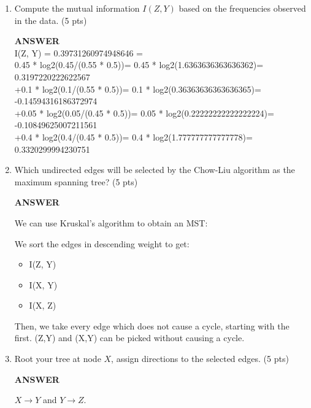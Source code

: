 \documentclass[a4paper]{article}
\theoremstyle{definition}
\begin{document}
\begin{enumerate}
	\item Compute the mutual information $I(Z, Y)$ based on the frequencies observed in the data. (5 pts)

        \textbf{ANSWER} \\
        I(Z, Y) = 0.39731260974948646 = \\
        0.45 * log2(0.45/(0.55 * 0.5))= 0.45 * log2(1.6363636363636362)= 0.3197220222622567\\
        +0.1 * log2(0.1/(0.55 * 0.5))= 0.1 * log2(0.36363636363636365)= -0.14594316186372974\\
        +0.05 * log2(0.05/(0.45 * 0.5))= 0.05 * log2(0.22222222222222224)= -0.10849625007211561\\
        +0.4 * log2(0.4/(0.45 * 0.5))= 0.4 * log2(1.777777777777778)= 0.3320299994230751\\

        \newpage
 
	\item Which undirected edges will be selected by the Chow-Liu algorithm as the maximum spanning tree? (5 pts)

        \textbf{ANSWER}
        
        We can use Kruskal's algorithm to obtain an MST: 
        
        We sort the edges in descending weight to get:
        \begin{itemize}
            \item I(Z, Y)
            \item I(X, Y)
            \item I(X, Z)
        \end{itemize}

        Then, we take every edge  which does not cause a cycle, starting with the first.
        (Z,Y) and (X,Y) can be picked without causing a cycle.
        
	\item Root your tree at node $X$, assign directions to the selected edges. (5 pts)

        \textbf{ANSWER}
        
        $X \longrightarrow Y$ and $Y \longrightarrow Z$.
        
\end{enumerate}

	
	
\end{document}
